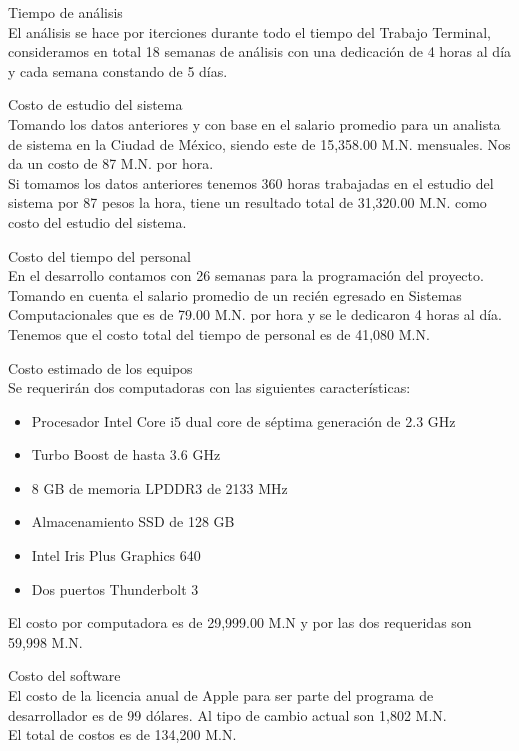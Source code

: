 	\begin{Citemize} 
		\item Tiempo de análisis\\
			El análisis se hace por iterciones durante todo el tiempo del Trabajo Terminal, consideramos en total 18 semanas de análisis con una dedicación de 4 horas al día y cada semana constando de 5 días.\\
			
		\item Costo de estudio del sistema\\
			Tomando los datos anteriores y con base en el salario promedio para un analista de sistema en la Ciudad de México, siendo este de 15,358.00 M.N. mensuales. \cite{17} Nos da un costo de 87 M.N. por hora.\\
			Si tomamos los datos anteriores tenemos 360 horas trabajadas en el estudio del sistema por 87 pesos la hora, tiene un resultado total de 31,320.00 M.N. como costo del estudio del sistema.\\
			
		\item Costo del tiempo del personal\\
			En el desarrollo contamos con 26 semanas para la programación del proyecto. Tomando en cuenta el salario promedio de un recién egresado en Sistemas Computacionales que es de 79.00 M.N. por hora y se le dedicaron 4 horas al día. \cite{18} Tenemos que el costo total del tiempo de personal es de 41,080 M.N.\\
			
		\item Costo estimado de los equipos\\
		Se requerirán dos computadoras con las siguientes características:
			\begin{itemize}
				\item Procesador Intel Core i5 dual core de séptima generación de 2.3 GHz
				\item Turbo Boost de hasta 3.6 GHz
				\item 8 GB de memoria LPDDR3 de 2133 MHz
				\item Almacenamiento SSD de 128 GB
				\item Intel Iris Plus Graphics 640
				\item Dos puertos Thunderbolt 3
			\end{itemize}
		El costo por computadora es de 29,999.00 M.N y por las dos requeridas son 59,998 M.N.
		
		\item Costo del software\\
		El costo de la licencia anual de Apple para ser parte del programa de desarrollador es de 99 dólares. Al tipo de cambio actual son 1,802 M.N.\\
		
		El total de costos es de 134,200 M.N.
		
	\end{Citemize}
